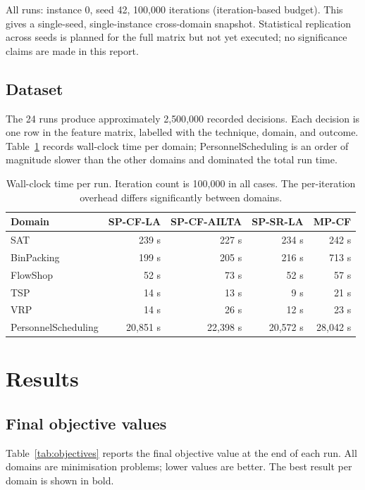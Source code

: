 \documentclass[11pt,a4paper]{article}
\begin{document}
All runs: instance 0, seed 42, 100{,}000 iterations (iteration-based budget).
This gives a single-seed, single-instance cross-domain snapshot. Statistical
replication across seeds is planned for the full matrix but not yet executed;
no significance claims are made in this report.

\subsection{Dataset}

The 24 runs produce approximately 2{,}500{,}000 recorded decisions. Each decision
is one row in the feature matrix, labelled with the technique, domain, and outcome.
Table~\ref{tab:wallclock} records wall-clock time per domain; PersonnelScheduling
is an order of magnitude slower than the other domains and dominated the total
run time.

\begin{table}[h]
\centering
\begin{tabular}{lrrrr}
\toprule
Domain & SP-CF-LA & SP-CF-AILTA & SP-SR-LA & MP-CF \\
\midrule
SAT                 & 239 s & 227 s & 234 s & 242 s \\
BinPacking          & 199 s & 205 s & 216 s & 713 s \\
FlowShop            &  52 s &  73 s &  52 s &  57 s \\
TSP                 &  14 s &  13 s &   9 s &  21 s \\
VRP                 &  14 s &  26 s &  12 s &  23 s \\
PersonnelScheduling & 20{,}851 s & 22{,}398 s & 20{,}572 s & 28{,}042 s \\
\bottomrule
\end{tabular}
\caption{Wall-clock time per run. Iteration count is 100,000 in all cases. The
per-iteration overhead differs significantly between domains.}
\label{tab:wallclock}
\end{table}

\section{Results}

\subsection{Final objective values}

Table~\ref{tab:objectives} reports the final objective value at the end of each run.
All domains are minimisation problems; lower values are better. The best result per
domain is shown in bold.
\end{document}
